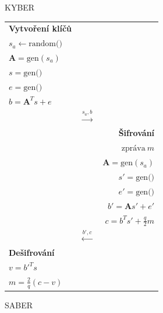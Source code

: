 \begin{figure}[ht]
    \centering
    \begin{minipage}[t]{0.5\textwidth}
        \centering
        \caption*{KYBER}

        \begin{tabular}{lcr}
        \textbf{Vytvoření klíčů} && \\
        $s_a \leftarrow \text{random()}$ && \\
        $\textbf{A} = \text{gen}(s_a)$ && \\
        $s = \text{gen()}$ && \\
        $e = \text{gen()}$ && \\
        $b = \textbf{A}^T s + e$ && \\
        & $\stackrel{s_a, b}{\longrightarrow}$ & \\
        && \textbf{Šifrování} \\
        && $\text{zpráva}\ m$ \\
        && $\textbf{A} = \text{gen}(s_a)$ \\
        && $s' = \text{gen()}$ \\
        && $e' = \text{gen()}$ \\
        && $b' = \textbf{A}s' + e'$ \\
        && $c = b^Ts' + \frac{q}{2}m$ \\
        & $\stackrel{b', c}{\longleftarrow}$ & \\
        \textbf{Dešifrování} && \\
        $v = b'^T s$ && \\
        $m = \frac{2}{q}(c - v)$ && \\
        \end{tabular}
    \end{minipage}\hfill\begin{minipage}[t]{0.5\textwidth}
        \centering
        \caption*{SABER}


\end{minipage}
\end{figure}
